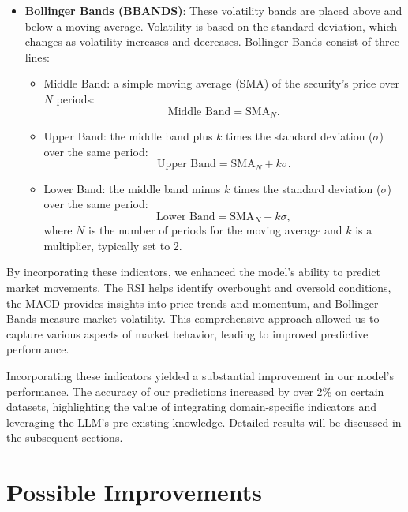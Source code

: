 \begin{itemize}
	\item \textbf{Bollinger Bands (BBANDS)}: These volatility bands are placed above and below a moving average. Volatility is based on the standard deviation, which changes as volatility increases and decreases. Bollinger Bands consist of three lines:

	      \begin{itemize}
		      \item Middle Band: a simple moving average (SMA) of the security's price over \( N \) periods:
		            \[
			            \text{Middle Band} = \text{SMA}_{N}.
		            \]

		      \item Upper Band: the middle band plus \( k \) times the standard deviation (\( \sigma \)) over the same period:
		            \[
			            \text{Upper Band} = \text{SMA}_{N} + k\sigma.
		            \]

		      \item Lower Band: the middle band minus \( k \) times the standard deviation (\( \sigma \)) over the same period:
		            \[
			            \text{Lower Band} = \text{SMA}_{N} - k\sigma,
		            \]
		            where \( N \) is the number of periods for the moving average and \( k \) is a multiplier, typically set to 2.
	      \end{itemize}

\end{itemize}

By incorporating these indicators, we enhanced the model's ability to predict market movements. The RSI helps identify overbought and oversold conditions, the MACD provides insights into price trends and momentum, and Bollinger Bands measure market volatility. This comprehensive approach allowed us to capture various aspects of market behavior, leading to improved predictive performance.

Incorporating these indicators yielded a substantial improvement in our model's performance. The accuracy of our predictions increased by over 2\% on certain datasets, highlighting the value of integrating domain-specific indicators and leveraging the LLM's pre-existing knowledge. Detailed results will be discussed in the subsequent sections.

\section{Possible Improvements}

